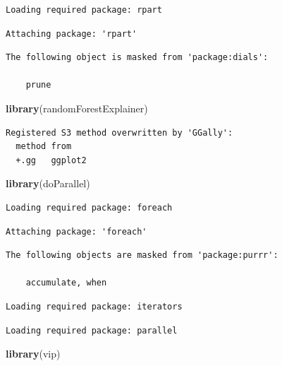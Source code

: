 \documentclass[
]{article}
\newenvironment{Shaded}{\begin{snugshade}}{\end{snugshade}}
\newcommand{\KeywordTok}[1]{\textcolor[rgb]{0.13,0.29,0.53}{\textbf{#1}}}
\newcommand{\NormalTok}[1]{#1}
\begin{document}
\begin{verbatim}
Loading required package: rpart
\end{verbatim}

\begin{verbatim}
Attaching package: 'rpart'
\end{verbatim}

\begin{verbatim}
The following object is masked from 'package:dials':

    prune
\end{verbatim}

\begin{Shaded}
\begin{Highlighting}[]
\KeywordTok{library}\NormalTok{(randomForestExplainer)}
\end{Highlighting}
\end{Shaded}

\begin{verbatim}
Registered S3 method overwritten by 'GGally':
  method from   
  +.gg   ggplot2
\end{verbatim}

\begin{Shaded}
\begin{Highlighting}[]
\KeywordTok{library}\NormalTok{(doParallel)}
\end{Highlighting}
\end{Shaded}

\begin{verbatim}
Loading required package: foreach
\end{verbatim}

\begin{verbatim}
Attaching package: 'foreach'
\end{verbatim}

\begin{verbatim}
The following objects are masked from 'package:purrr':

    accumulate, when
\end{verbatim}

\begin{verbatim}
Loading required package: iterators
\end{verbatim}

\begin{verbatim}
Loading required package: parallel
\end{verbatim}

\begin{Shaded}
\begin{Highlighting}[]
\KeywordTok{library}\NormalTok{(vip)}
\end{Highlighting}
\end{Shaded}
\end{document}
